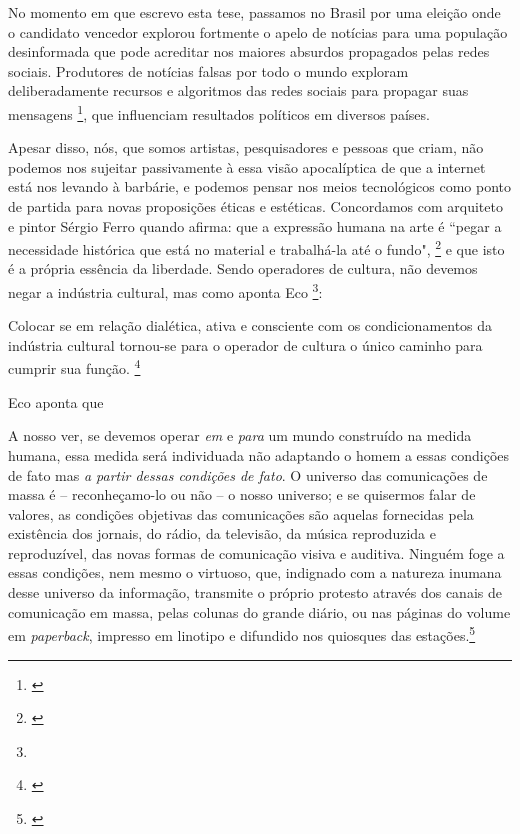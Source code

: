 No momento em que escrevo esta tese, passamos no Brasil por uma eleição onde o candidato vencedor explorou fortmente o apelo de notícias para uma população desinformada que pode acreditar nos maiores absurdos propagados pelas redes sociais. Produtores de notícias falsas por todo o mundo exploram deliberadamente recursos e algoritmos das redes sociais para propagar suas mensagens \footnote{\cite{Martens2018}}, que influenciam resultados políticos em diversos países.

Apesar disso, nós, que somos artistas, pesquisadores e pessoas que criam, não podemos nos sujeitar passivamente à essa visão apocalíptica de que a internet está nos levando à barbárie, e podemos pensar nos meios tecnológicos como ponto de partida para novas proposições éticas e estéticas. Concordamos com arquiteto e pintor Sérgio Ferro quando afirma: que a expressão humana na arte é ``pegar a necessidade histórica que está no material e trabalhá-la até o fundo", \footnote{\cite{FerroSergio2002}} e que isto é a própria essência da liberdade. Sendo operadores de cultura, não devemos negar a indústria cultural, mas como aponta Eco \footnote{}: 

\begin{citacao}
Colocar se em relação dialética, ativa e consciente com os condicionamentos da indústria cultural tornou-se para o operador de cultura o único caminho para cumprir sua função. \footnote{\cite[14]{Eco1970}}
\end{citacao}

Eco \citeyear{Eco1970} aponta que 

\begin{citacao}
A nosso ver, se devemos operar \emph{em} e \emph{para} um mundo construído na medida humana, essa medida será individuada não adaptando o homem a essas condições de fato mas \emph{a partir dessas condições de fato}. O universo das comunicações de massa é -- reconheçamo-lo ou não -- o nosso universo; e se quisermos falar de valores, as condições objetivas das comunicações são aquelas fornecidas pela existência dos jornais, do rádio, da televisão, da música reproduzida e reproduzível, das novas formas de comunicação visiva e auditiva. Ninguém foge a essas condições, nem mesmo o virtuoso, que, indignado com a natureza inumana desse universo da informação, transmite o próprio protesto através dos canais de comunicação em massa, pelas colunas do grande diário, ou nas páginas do volume em \emph{paperback}, impresso em linotipo e difundido nos quiosques das estações.\footnote{\cite[13]{Eco1970}}

\end{citacao}


